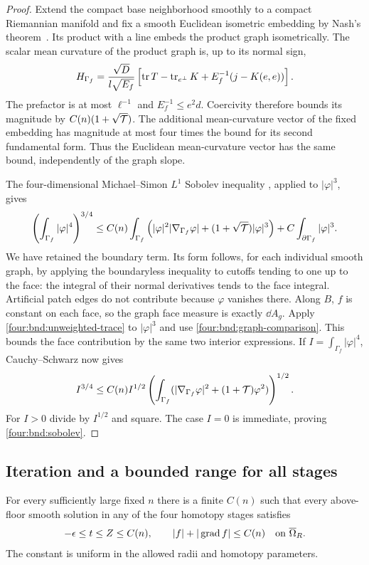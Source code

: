 \begin{proof}
Extend the compact base neighborhood smoothly to a compact
Riemannian manifold and fix a smooth Euclidean isometric embedding
by Nash's theorem~\cite{Nash1956}.
Its product with a line embeds the product graph isometrically.
The scalar mean curvature of the product graph is, up to its normal
sign,
\[
 H_{\Gamma_f}=
 \frac{\sqrt D}{l\sqrt{E_f}}
 \left[\operatorname{tr} T-\operatorname{tr}_{e^\perp}K+E_f^{-1}(j-K(e,e))\right].
\]
The prefactor is at most $\ell^{-1}$ and
$E_f^{-1}\le e^2d$.  Coercivity therefore bounds its magnitude
by $C(n)(1+\sqrt{\mathcal T})$.  The additional mean-curvature vector
of the fixed embedding has magnitude at most four times the
bound for its second fundamental form.  Thus the Euclidean
mean-curvature vector has the same bound, independently of the
graph slope.

The four-dimensional Michael--Simon $L^1$ Sobolev inequality
\cite{MichaelSimon1973,Simon2014}, applied to $|\varphi|^3$, gives
\begin{align*}
 \left(\int_{\Gamma_f}|\varphi|^4\right)^{3/4}
 \le C(n)\int_{\Gamma_f}
 \left(|\varphi|^2|\nabla_{\Gamma_f}\varphi|
       +(1+\sqrt{\mathcal T})|\varphi|^3\right)
       +C\int_{\partial\Gamma_f}|\varphi|^3.
\end{align*}
We have retained the boundary term.  Its form follows, for each
individual smooth graph, by applying the boundaryless inequality
to cutoffs tending to one up to the face: the integral of their
normal derivatives tends to the face integral.  Artificial patch
edges do not contribute because $\varphi$ vanishes there.  Along
$B$, $f$ is constant on each face, so the graph face measure is
exactly $\dd A_g$.  Apply \eqref{four:bnd:unweighted-trace} to
$|\varphi|^3$ and use \eqref{four:bnd:graph-comparison}.  This bounds
the face contribution by the same two interior expressions.
If $I=\int_{\Gamma_f}|\varphi|^4$, Cauchy--Schwarz now gives
\[
 I^{3/4}\le C(n) I^{1/2}
 \left(\int_{\Gamma_f}
   (|\nabla_{\Gamma_f}\varphi|^2+(1+\mathcal T)\varphi^2)\right)^{1/2}.
\]
For $I>0$ divide by $I^{1/2}$ and square.  The case $I=0$ is
immediate, proving \eqref{four:bnd:sobolev}.
\end{proof}

\subsection{Iteration and a bounded range for all stages}

\begin{proposition}\label{four:prop:bounded-range}
For every sufficiently large fixed $n$ there is a finite $C(n)$
such that every above-floor smooth solution in any of the four
homotopy stages satisfies
\begin{equation}\label{four:eq:bounded-range}
 -\epsilon\le t\le Z\le C(n),\qquad
 |f|+|\operatorname{grad} f|\le C(n)\quad\text{on }\overline\Omega_R.
\end{equation}
The constant is uniform in the allowed radii and homotopy parameters.
\end{proposition}

